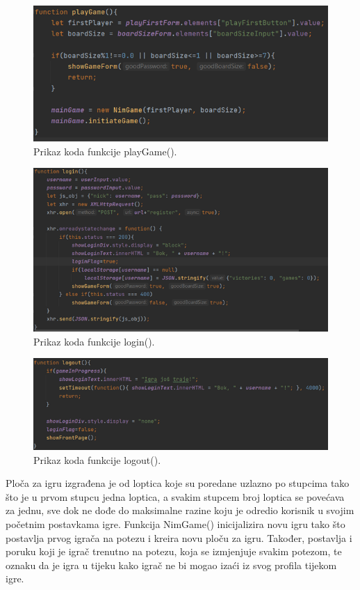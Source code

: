 \begin{figure}[H]
\centering
\includegraphics[width=14cm]{slike-kod/Slika6.png}
\caption{Prikaz koda funkcije playGame().}
\label{}
\end{figure}


\begin{figure}[H]
\centering
\includegraphics[width=14cm]{slike-kod/Slika7.png}
\caption{Prikaz koda funkcije login().}
\label{}
\end{figure}

\begin{figure}[H]
\centering
\includegraphics[width=14cm]{slike-kod/Slika8.png}
\caption{Prikaz koda funkcije logout().}
\label{}
\end{figure}


Ploča za igru izgrađena je od loptica koje su poredane uzlazno po stupcima tako što je u prvom stupcu jedna loptica, a svakim stupcem broj loptica se povećava za jednu, sve dok ne dođe do maksimalne razine koju je odredio korisnik u svojim početnim postavkama igre. Funkcija NimGame() inicijalizira novu igru tako što postavlja prvog igrača na potezu i kreira novu ploču za igru. Također, postavlja i poruku koji je igrač trenutno na potezu, koja se izmjenjuje svakim potezom, te oznaku da je igra u tijeku kako igrač ne bi mogao izaći iz svog profila tijekom igre.


